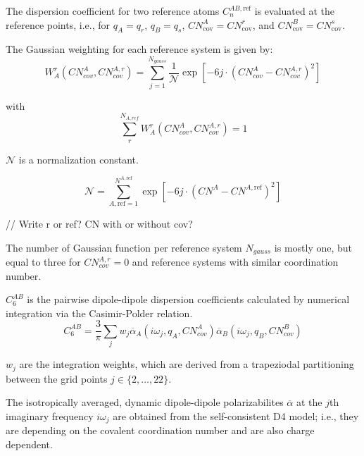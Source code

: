 The dispersion coefficient for two reference atoms \(C_n^{AB,\text{ref}}\) is evaluated at the reference points, i.e., for \(q_A = q_r\), \(q_B = q_s\), \(CN_{\text{cov}}^A = CN_{\text{cov}}^r\), and \(CN_{\text{cov}}^B = CN_{\text{cov}}^s\).

\vspace{10pt}
\noindent
The Gaussian weighting for each reference system is given by:
\begin{equation}
  W_A^r(CN_{cov}^A, CN_{cov}^{A,r}) = \sum_{j=1}^{N_{gauss}} \frac{1}{\mathcal{N}} \exp\left[-6j \cdot (CN_{cov}^A - CN_{cov}^{A,r})^2\right]
\end{equation}

with
\begin{equation}
  \sum_{r}^{N_{A,ref}} W_A^r(CN_{cov}^A, CN_{cov}^{A,r}) = 1
\end{equation}

\vspace{10pt}
\noindent
\(\mathcal{N}\) is a normalization constant.

\begin{equation}
  \mathcal{N} = \sum_{A,\text{ref}=1}^{N^{A,\text{ref}}} \exp\left[-6j \cdot (CN^A - CN^{A,\text{ref}})^2\right]
\end{equation}

// Write r or ref? CN with or without cov?

\vspace{10pt}
\noindent
The number of Gaussian function per reference system \(N_{gauss}\) is mostly one, but equal to three for \(CN_{cov}^{A,r} = 0\) and reference systems with similar coordination number.


\vspace{10pt}
\noindent
\(C_6^{AB}\) is the pairwise dipole-dipole dispersion coefficients calculated by numerical integration via the Casimir-Polder relation.
\begin{equation}
  C_6^{AB} = \frac{3}{\pi} \sum_{j} w_j \overline{\alpha}_A (i\omega_j, q_A, CN_{cov}^A)\overline{\alpha}_B (i\omega_j, q_B, CN_{cov}^B)
\end{equation}

\noindent
\(w_j\) are the integration weights, which are derived from a trapeziodal partitioning between the grid points \(j \in \{2, \dots, 22\}\).


\noindent
The isotropically averaged, dynamic dipole-dipole polarizabilites \(\overline{\alpha}\) at the \(j\)th imaginary frequency \(i\omega_j\) are obtained from the self-consistent D4 model; i.e., they are depending on the covalent coordination number and are also charge dependent.

